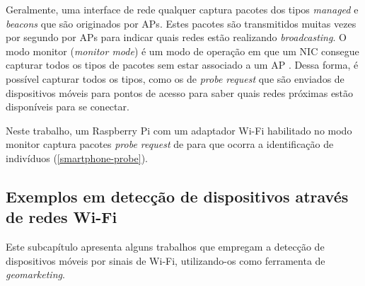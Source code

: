 Geralmente, uma interface de rede qualquer captura pacotes dos tipos \emph{managed} e \emph{beacons} que são originados por APs. Estes pacotes são transmitidos
muitas vezes por segundo por APs para indicar quais redes estão realizando \emph{broadcasting}. O modo monitor (\emph{monitor mode}) é um modo de operação em que um NIC consegue capturar todos os tipos de pacotes sem estar associado a um AP \cite{Acrylic} \cite{Wireshark2017b}. Dessa forma, é possível capturar todos os tipos, como os de \emph{probe request} que são enviados de dispositivos móveis para pontos de acesso para saber quais redes próximas estão disponíveis para se conectar.

Neste trabalho, um Raspberry Pi com um adaptador Wi-Fi habilitado no modo monitor captura pacotes \emph{probe request} de 
para que ocorra a identificação de indivíduos (\autoref{smartphone-probe}).

\subsection{Exemplos em detecção de dispositivos através de redes Wi-Fi}
\label{trabalhos-correlatos}
Este subcapítulo apresenta alguns trabalhos que empregam a detecção de dispositivos móveis por sinais de Wi-Fi, utilizando-os como ferramenta de \emph{geomarketing}.

